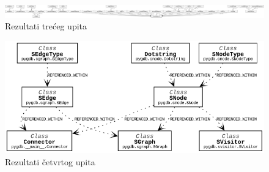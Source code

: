 \begin{figure}[h]
    \includegraphics[angle=-90, scale=0.12]{assets/nasl.png}
    \centering
    \caption{Rezultati trećeg upita}
    \label{fig:upit3}
\end{figure}

\begin{figure}[h]
    \includegraphics[scale=0.5]{assets/klref.png}
    \centering
    \caption{Rezultati četvrtog upita}
    \label{fig:upit4}
\end{figure}

